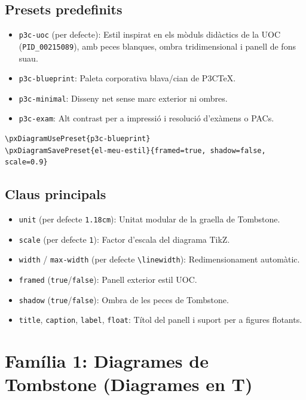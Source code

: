 \documentclass[11pt,a4paper]{article}
\begin{document}
\subsection{Presets predefinits}
\begin{itemize}
  \item \texttt{p3c-uoc} (per defecte): Estil inspirat en els m\`oduls did\`actics de la UOC
    (\texttt{PID\_00215089}), amb peces blanques, ombra tridimensional i panell de fons suau.
  \item \texttt{p3c-blueprint}: Paleta corporativa blava/cian de P3CTeX.
  \item \texttt{p3c-minimal}: Disseny net sense marc exterior ni ombres.
  \item \texttt{p3c-exam}: Alt contrast per a impressi\'o i resoluci\'o d'ex\`amens o PACs.
\end{itemize}

\begin{verbatim}
\pxDiagramUsePreset{p3c-blueprint}
\pxDiagramSavePreset{el-meu-estil}{framed=true, shadow=false, scale=0.9}
\end{verbatim}

\subsection{Claus principals}
\begin{itemize}
  \item \texttt{unit} (per defecte \texttt{1.18cm}): Unitat modular de la graella de Tombstone.
  \item \texttt{scale} (per defecte \texttt{1}): Factor d'escala del diagrama TikZ.
  \item \texttt{width} / \texttt{max-width} (per defecte \texttt{\textbackslash linewidth}): Redimensionament autom\`atic.
  \item \texttt{framed} (\texttt{true}/\texttt{false}): Panell exterior estil UOC.
  \item \texttt{shadow} (\texttt{true}/\texttt{false}): Ombra de les peces de Tombstone.
  \item \texttt{title}, \texttt{caption}, \texttt{label}, \texttt{float}: T\'itol del panell i suport per a figures flotants.
\end{itemize}

\newpage
\section{Fam\'ilia 1: Diagrames de Tombstone (Diagrames en T)}
\end{document}
